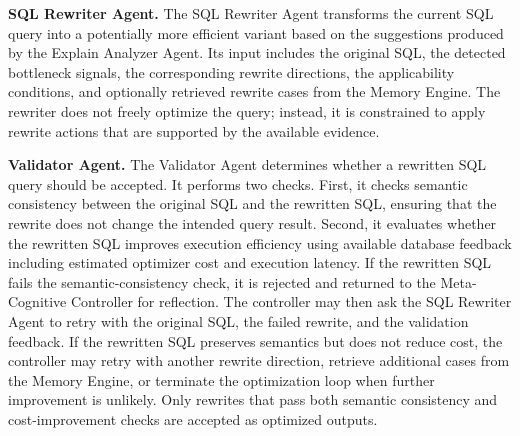 \textbf{SQL Rewriter Agent.}
The SQL Rewriter Agent transforms the current SQL query into a potentially more efficient variant based on the suggestions produced by the Explain Analyzer Agent.
Its input includes the original SQL, the detected bottleneck signals, the corresponding rewrite directions, the applicability conditions, and optionally retrieved rewrite cases from the Memory Engine.
The rewriter does not freely optimize the query; instead, it is constrained to apply rewrite actions that are supported by the available evidence.

\textbf{Validator Agent.}
The Validator Agent determines whether a rewritten SQL query should be accepted.
It performs two checks.
First, it checks semantic consistency between the original SQL and the rewritten SQL, ensuring that the rewrite does not change the intended query result.
Second, it evaluates whether the rewritten SQL improves execution efficiency using available database feedback including estimated optimizer cost and execution latency.
%
If the rewritten SQL fails the semantic-consistency check, it is rejected and returned to the Meta-Cognitive Controller for reflection.
The controller may then ask the SQL Rewriter Agent to retry with the original SQL, the failed rewrite, and the validation feedback.
If the rewritten SQL preserves semantics but does not reduce cost, the controller may retry with another rewrite direction, retrieve additional cases from the Memory Engine, or terminate the optimization loop when further improvement is unlikely.
Only rewrites that pass both semantic consistency and cost-improvement checks are accepted as optimized outputs.

